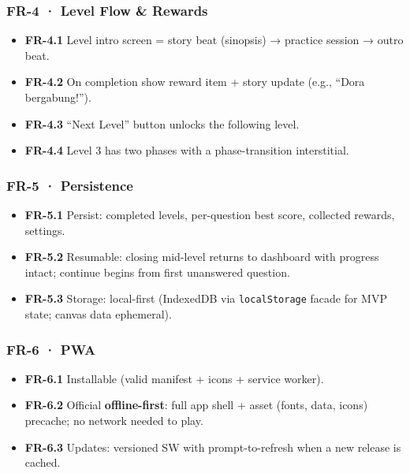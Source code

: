 \documentclass[
  11pt,
]{article}
\providecommand{\tightlist}{%
  \setlength{\itemsep}{0pt}\setlength{\parskip}{0pt}}
\begin{document}
\subsubsection{FR-4 · Level Flow \&
Rewards}\label{fr-4-level-flow-rewards}

\begin{itemize}
\tightlist
\item
  \textbf{FR-4.1} Level intro screen = story beat (sinopsis) → practice
  session → outro beat.
\item
  \textbf{FR-4.2} On completion show reward item + story update (e.g.,
  ``Dora bergabung!'').
\item
  \textbf{FR-4.3} ``Next Level'' button unlocks the following level.
\item
  \textbf{FR-4.4} Level 3 has two phases with a phase-transition
  interstitial.
\end{itemize}

\subsubsection{FR-5 · Persistence}\label{fr-5-persistence}

\begin{itemize}
\tightlist
\item
  \textbf{FR-5.1} Persist: completed levels, per-question best score,
  collected rewards, settings.
\item
  \textbf{FR-5.2} Resumable: closing mid-level returns to dashboard with
  progress intact; continue begins from first unanswered question.
\item
  \textbf{FR-5.3} Storage: local-first (IndexedDB via
  \texttt{localStorage} facade for MVP state; canvas data ephemeral).
\end{itemize}

\subsubsection{FR-6 · PWA}\label{fr-6-pwa}

\begin{itemize}
\tightlist
\item
  \textbf{FR-6.1} Installable (valid manifest + icons + service worker).
\item
  \textbf{FR-6.2} Official \textbf{offline-first}: full app shell +
  asset (fonts, data, icons) precache; no network needed to play.
\item
  \textbf{FR-6.3} Updates: versioned SW with prompt-to-refresh when a
  new release is cached.
\end{itemize}
\end{document}
